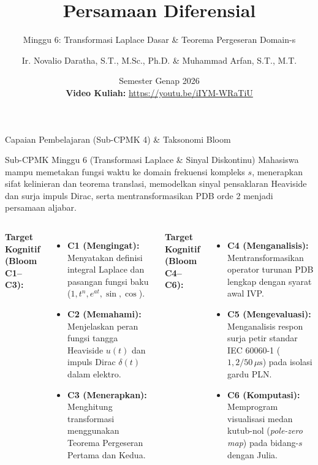 \documentclass[aspectratio=169,10pt]{beamer}
\title[Persamaan Diferensial (Minggu 6)]{Persamaan Diferensial}
\subtitle{Minggu 6: Transformasi Laplace Dasar \& Teorema Pergeseran Domain-s}
\author[Novalio \& Arfan (UNIB)]{Ir. Novalio Daratha, S.T., M.Sc., Ph.D. \& Muhammad Arfan, S.T., M.T.}
\institute[Teknik Elektro UNIB]{Program Studi S1 Teknik Elektro, Jurusan Teknik Elektro \& Informatika\\Fakultas Teknik, Universitas Bengkulu}
\date[2026]{Semester Genap 2026 \\[1.5mm] {\scriptsize\color{red!85!black}\textbf{Video Kuliah:}} {\scriptsize\url{https://youtu.be/iIYM-WRaTiU}} \quad \textbar \quad {\scriptsize\href{https://www.youtube.com/playlist?list=PLS5oOZWXZeTw}{\color{unibblue}\textbf{Playlist YouTube}}}}
\begin{document}
\begin{frame}[plain]
  \titlepage
\end{frame}

\begin{frame}{Capaian Pembelajaran (Sub-CPMK 4) \& Taksonomi Bloom}
  \begin{block}{Sub-CPMK Minggu 6 (Transformasi Laplace \& Sinyal Diskontinu)}
    Mahasiswa mampu memetakan fungsi waktu ke domain frekuensi kompleks $s$, menerapkan sifat kelinieran dan teorema translasi, memodelkan sinyal pensaklaran Heaviside dan surja impuls Dirac, serta mentransformasikan PDB orde 2 menjadi persamaan aljabar.
  \end{block}
  \vspace{0.15cm}
  \begin{columns}[t]
    \textbf{Target Kognitif (Bloom C1--C3):}
    \begin{itemize}
      \item \textbf{C1 (Mengingat):} Menyatakan definisi integral Laplace dan pasangan fungsi baku ($1, t^n, e^{at}, \sin, \cos$).
      \item \textbf{C2 (Memahami):} Menjelaskan peran fungsi tangga Heaviside $u(t)$ dan impuls Dirac $\delta(t)$ dalam elektro.
      \item \textbf{C3 (Menerapkan):} Menghitung transformasi menggunakan Teorema Pergeseran Pertama dan Kedua.
    \end{itemize}

    \textbf{Target Kognitif (Bloom C4--C6):}
    \begin{itemize}
      \item \textbf{C4 (Menganalisis):} Mentransformasikan operator turunan PDB lengkap dengan syarat awal IVP.
      \item \textbf{C5 (Mengevaluasi):} Menganalisis respon surja petir standar IEC 60060-1 ($1{,}2/50\,\mu\text{s}$) pada isolasi gardu PLN.
      \item \textbf{C6 (Komputasi):} Memprogram visualisasi medan kutub-nol (\textit{pole-zero map}) pada bidang-$s$ dengan Julia.
    \end{itemize}
  \end{columns}
\end{frame}
\end{document}
